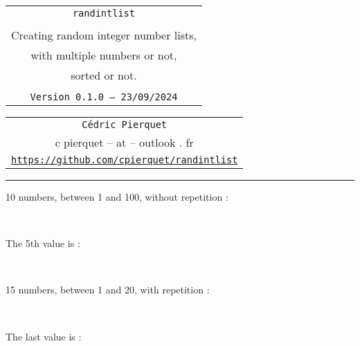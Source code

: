 \documentclass[11pt,a4paper]{ltxdoc}
\def\TPversion{0.1.0}
\def\TPdate{23/09/2024}
\begin{document}
\thispagestyle{empty}

\begin{center}
	\begin{minipage}{0.88\linewidth}
		\begin{tcolorbox}[colframe=yellow,colback=yellow!15]
			\begin{center}
				\renewcommand{\arraystretch}{1.25}%
				\begin{tabular}{c}
					{\Huge \texttt{randintlist}}\\
					\\
					{\LARGE Creating random integer number lists,} \\
					{\LARGE with multiple numbers or not,} \\
					{\LARGE sorted or not.} \\
					\\
					{\small \texttt{Version \TPversion{} -- \TPdate}}
				\end{tabular}
			\end{center}
		\end{tcolorbox}
	\end{minipage}
\end{center}

\begin{center}
	\begin{tabular}{c}
		\texttt{Cédric Pierquet}\\
		{\ttfamily c pierquet -- at -- outlook . fr}\\
		\texttt{\url{https://github.com/cpierquet/randintlist}} \\
	\end{tabular}
\end{center}

\hrule

\vfill

\begin{tcolorbox}[colframe=lightgray,colback=lightgray!5]
10 numbers, between 1 and 100, without repetition :

\hfill\randintlist[min=1,max=100,nb=10]{\mylist}\textcolor{red}{\mylist}\hfill~

The 5th value is :

\hfill\textcolor{blue}{}\hfill~
\end{tcolorbox}

\begin{tcolorbox}[colframe=lightgray,colback=lightgray!5]
15 numbers, between 1 and 20, with repetition :

\hfill\randintlist[min=1,max=20,nb=15,repeat]{\mylist}\textcolor{red}{\mylist}\hfill~

The last value is :

\hfill\textcolor{blue}{}\hfill~
\end{tcolorbox}
\end{document}
